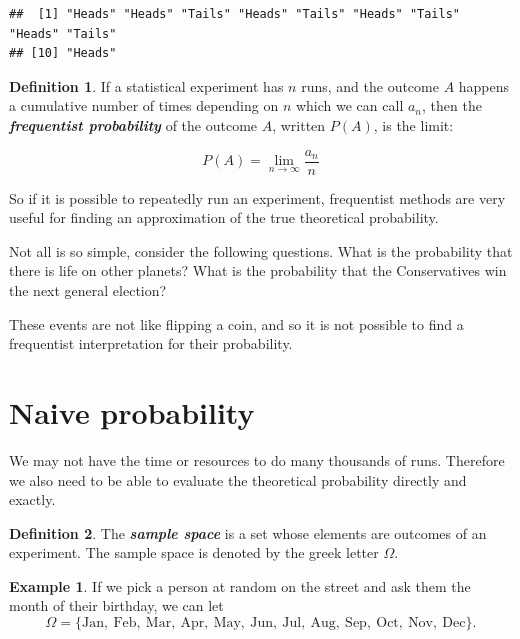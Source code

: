 \documentclass[
]{book}
\theoremstyle{definition}
\newtheorem{definition}{Definition}[chapter]
\theoremstyle{definition}
\newtheorem{example}{Example}[chapter]
\theoremstyle{definition}
\theoremstyle{definition}
\theoremstyle{remark}
\begin{document}
\begin{verbatim}
##  [1] "Heads" "Heads" "Tails" "Heads" "Tails" "Heads" "Tails" "Heads" "Tails"
## [10] "Heads"
\end{verbatim}

\begin{definition}
\protect\hypertarget{def:freq}{}\label{def:freq}If a statistical experiment has \(n\) runs, and the outcome \(A\) happens a cumulative number of times depending on \(n\) which we can call \(a_n\), then the \textbf{\emph{frequentist probability}} of the outcome \(A\), written \(P(A)\), is the limit:

\[P(A) = \lim_{n\to \infty} \frac{a_n}{n}\]
\end{definition}

So if it is possible to repeatedly run an experiment, frequentist methods are very useful for finding an approximation of the true theoretical probability.

Not all is so simple, consider the following questions. What is the probability that there is life on other planets? What is the probability that the Conservatives win the next general election?

These events are not like flipping a coin, and so it is not possible to find a frequentist interpretation for their probability.

\hypertarget{naive-probability}{%
\section{Naive probability}\label{naive-probability}}

We may not have the time or resources to do many thousands of runs. Therefore we also need to be able to evaluate the theoretical probability directly and exactly.

\begin{definition}
\protect\hypertarget{def:samplespace}{}\label{def:samplespace}The \textbf{\emph{sample space}} is a set whose elements are outcomes of an experiment. The sample space is denoted by the greek letter \(\Omega\).
\end{definition}

\begin{example}
\protect\hypertarget{exm:monthspace}{}\label{exm:monthspace}If we pick a person at random on the street and ask them the month of their birthday,
we can let
\[\Omega = \{\text{Jan}, \ \text{Feb}, \ \text{Mar},  \ \text{Apr}, \ \text{May}, \ \text{Jun}, \ \text{Jul}, \ \text{Aug}, \ \text{Sep}, \ \text{Oct}, \ \text{Nov}, \ \text{Dec} \}.\]
\end{example}
\end{document}
